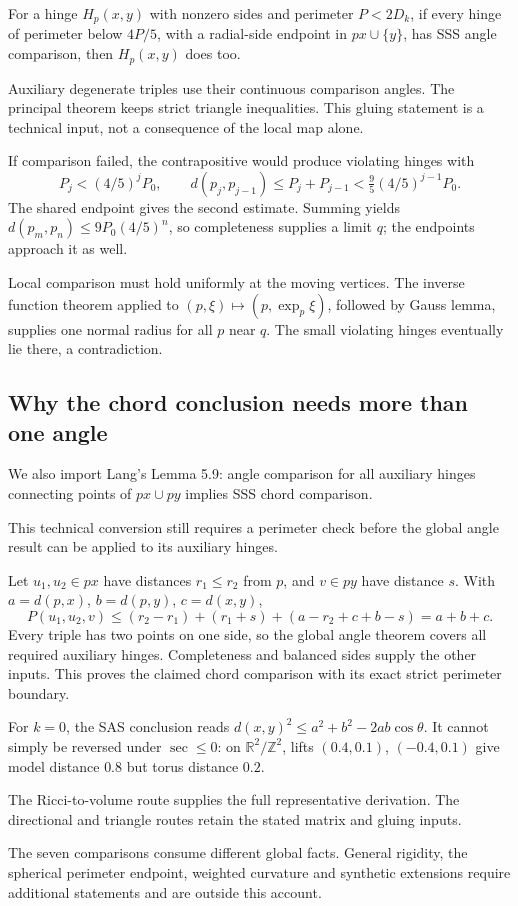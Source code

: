 \documentclass[12pt,reqno]{amsart}
\begin{document}
For a hinge \(H_p(x,y)\) with nonzero sides and perimeter \(P<2D_k\), if every hinge of perimeter below \(4P/5\), with a radial-side endpoint in \(px\cup\{y\}\), has SSS angle comparison, then \(H_p(x,y)\) does too.

Auxiliary degenerate triples use their continuous comparison angles. The principal theorem keeps strict triangle inequalities. This gluing statement is a technical input, not a consequence of the local map alone.

If comparison failed, the contrapositive would produce violating hinges with
\[
P_j<(4/5)^jP_0,\qquad
d(p_j,p_{j-1})\le P_j+P_{j-1}
<\tfrac95(4/5)^{j-1}P_0.
\]
The shared endpoint gives the second estimate. Summing yields \(d(p_m,p_n)\le9P_0(4/5)^n\), so completeness supplies a limit \(q\); the endpoints approach it as well.

Local comparison must hold uniformly at the moving vertices. The inverse function theorem applied to \((p,\xi)\mapsto(p,\exp_p\xi)\), followed by Gauss lemma, supplies one normal radius for all \(p\) near \(q\). The small violating hinges eventually lie there, a contradiction.

\subsection*{Why the chord conclusion needs more than one angle}
We also import Lang's Lemma 5.9: angle comparison for all auxiliary hinges connecting points of \(px\cup py\) implies SSS chord comparison.

This technical conversion still requires a perimeter check before the global angle result can be applied to its auxiliary hinges.

Let \(u_1,u_2\in px\) have distances \(r_1\le r_2\) from \(p\), and \(v\in py\) have distance \(s\). With \(a=d(p,x)\), \(b=d(p,y)\), \(c=d(x,y)\),
\[
P(u_1,u_2,v)\le(r_2-r_1)+(r_1+s)+(a-r_2+c+b-s)=a+b+c.
\]
Every triple has two points on one side, so the global angle theorem covers all required auxiliary hinges. Completeness and balanced sides supply the other inputs. This proves the claimed chord comparison with its exact strict perimeter boundary.

For \(k=0\), the SAS conclusion reads \(d(x,y)^2\le a^2+b^2-2ab\cos\theta\). It cannot simply be reversed under \(\sec\le0\): on \(\mathbb R^2/\mathbb Z^2\), lifts \((0.4,0.1)\), \((-0.4,0.1)\) give model distance \(0.8\) but torus distance \(0.2\).

The Ricci-to-volume route supplies the full representative derivation. The directional and triangle routes retain the stated matrix and gluing inputs.

The seven comparisons consume different global facts. General rigidity, the spherical perimeter endpoint, weighted curvature and synthetic extensions require additional statements and are outside this account.



\end{document}
